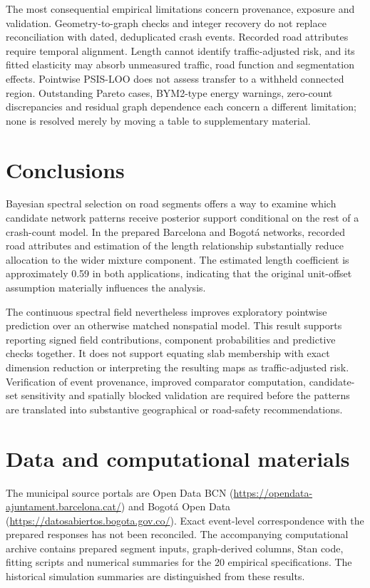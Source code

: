 \documentclass[11pt]{article}
\begin{document}
The most consequential empirical limitations concern provenance, exposure and validation. Geometry-to-graph checks and integer recovery do not replace reconciliation with dated, deduplicated crash events. Recorded road attributes require temporal alignment. Length cannot identify traffic-adjusted risk, and its fitted elasticity may absorb unmeasured traffic, road function and segmentation effects. Pointwise PSIS-LOO does not assess transfer to a withheld connected region. Outstanding Pareto cases, BYM2-type energy warnings, zero-count discrepancies and residual graph dependence each concern a different limitation; none is resolved merely by moving a table to supplementary material.

\section{Conclusions}
Bayesian spectral selection on road segments offers a way to examine which candidate network patterns receive posterior support conditional on the rest of a crash-count model. In the prepared Barcelona and Bogot\'a networks, recorded road attributes and estimation of the length relationship substantially reduce allocation to the wider mixture component. The estimated length coefficient is approximately 0.59 in both applications, indicating that the original unit-offset assumption materially influences the analysis.

The continuous spectral field nevertheless improves exploratory pointwise prediction over an otherwise matched nonspatial model. This result supports reporting signed field contributions, component probabilities and predictive checks together. It does not support equating slab membership with exact dimension reduction or interpreting the resulting maps as traffic-adjusted risk. Verification of event provenance, improved comparator computation, candidate-set sensitivity and spatially blocked validation are required before the patterns are translated into substantive geographical or road-safety recommendations.

\FloatBarrier
\section*{Data and computational materials}
The municipal source portals are Open Data BCN (\url{https://opendata-ajuntament.barcelona.cat/}) and Bogot\'a Open Data (\url{https://datosabiertos.bogota.gov.co/}). Exact event-level correspondence with the prepared responses has not been reconciled. The accompanying computational archive contains prepared segment inputs, graph-derived columns, Stan code, fitting scripts and numerical summaries for the 20 empirical specifications. The historical simulation summaries are distinguished from these results.
\end{document}
